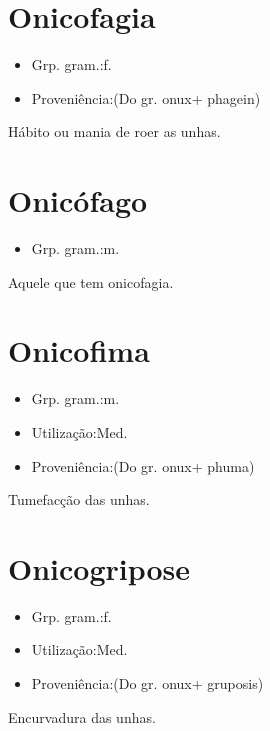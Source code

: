 \section{Onicofagia}
\begin{itemize}
\item {Grp. gram.:f.}
\end{itemize}
\begin{itemize}
\item {Proveniência:(Do gr. \textunderscore onux\textunderscore  + \textunderscore phagein\textunderscore )}
\end{itemize}
Hábito ou mania de roer as unhas.
\section{Onicófago}
\begin{itemize}
\item {Grp. gram.:m.}
\end{itemize}
Aquele que tem onicofagia.
\section{Onicofima}
\begin{itemize}
\item {Grp. gram.:m.}
\end{itemize}
\begin{itemize}
\item {Utilização:Med.}
\end{itemize}
\begin{itemize}
\item {Proveniência:(Do gr. \textunderscore onux\textunderscore  + \textunderscore phuma\textunderscore )}
\end{itemize}
Tumefacção das unhas.
\section{Onicogripose}
\begin{itemize}
\item {Grp. gram.:f.}
\end{itemize}
\begin{itemize}
\item {Utilização:Med.}
\end{itemize}
\begin{itemize}
\item {Proveniência:(Do gr. \textunderscore onux\textunderscore  + \textunderscore gruposis\textunderscore )}
\end{itemize}
Encurvadura das unhas.
